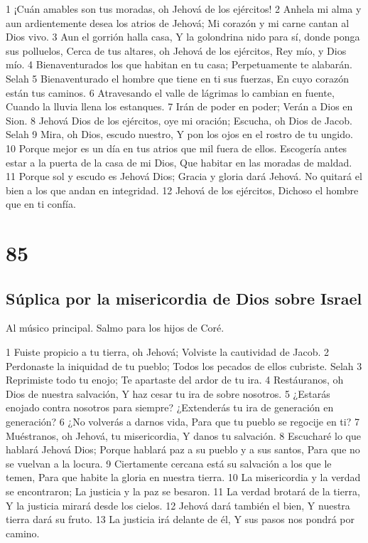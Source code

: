 1 ¡Cuán amables son tus moradas, oh Jehová de los ejércitos!
2 Anhela mi alma y aun ardientemente desea los atrios de Jehová;
Mi corazón y mi carne cantan al Dios vivo.
3 Aun el gorrión halla casa,
Y la golondrina nido para sí, donde ponga sus polluelos,
Cerca de tus altares, oh Jehová de los ejércitos,
Rey mío, y Dios mío.
4 Bienaventurados los que habitan en tu casa;
Perpetuamente te alabarán. Selah
5 Bienaventurado el hombre que tiene en ti sus fuerzas,
En cuyo corazón están tus caminos.
6 Atravesando el valle de lágrimas lo cambian en fuente,
Cuando la lluvia llena los estanques.
7 Irán de poder en poder;
Verán a Dios en Sion.
8 Jehová Dios de los ejércitos, oye mi oración;
Escucha, oh Dios de Jacob. Selah
9 Mira, oh Dios, escudo nuestro,
Y pon los ojos en el rostro de tu ungido.
10 Porque mejor es un día en tus atrios que mil fuera de ellos.
Escogería antes estar a la puerta de la casa de mi Dios,
Que habitar en las moradas de maldad.
11 Porque sol y escudo es Jehová Dios;
Gracia y gloria dará Jehová.
No quitará el bien a los que andan en integridad.
12 Jehová de los ejércitos,
Dichoso el hombre que en ti confía.

\chapter{85}

\section*{Súplica por la misericordia de Dios sobre Israel}

Al músico principal. Salmo para los hijos de Coré.

1 Fuiste propicio a tu tierra, oh Jehová;
Volviste la cautividad de Jacob.
2 Perdonaste la iniquidad de tu pueblo;
Todos los pecados de ellos cubriste. Selah
3 Reprimiste todo tu enojo;
Te apartaste del ardor de tu ira.
4 Restáuranos, oh Dios de nuestra salvación,
Y haz cesar tu ira de sobre nosotros.
5 ¿Estarás enojado contra nosotros para siempre?
¿Extenderás tu ira de generación en generación?
6 ¿No volverás a darnos vida,
Para que tu pueblo se regocije en ti?
7 Muéstranos, oh Jehová, tu misericordia,
Y danos tu salvación.
8 Escucharé lo que hablará Jehová Dios;
Porque hablará paz a su pueblo y a sus santos,
Para que no se vuelvan a la locura.
9 Ciertamente cercana está su salvación a los que le temen,
Para que habite la gloria en nuestra tierra.
10 La misericordia y la verdad se encontraron;
La justicia y la paz se besaron.
11 La verdad brotará de la tierra,
Y la justicia mirará desde los cielos.
12 Jehová dará también el bien,
Y nuestra tierra dará su fruto.
13 La justicia irá delante de él,
Y sus pasos nos pondrá por camino.

